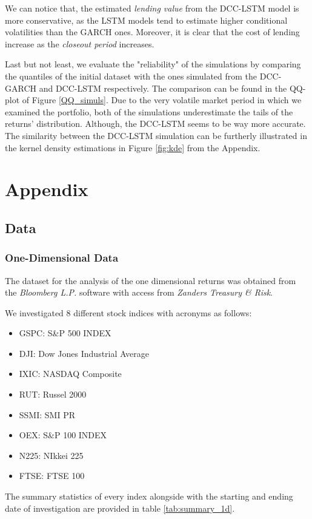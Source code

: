\documentclass[a4paper, oneside]{discothesis}
\begin{document}
We can notice that, the estimated \textit{lending value} from the DCC-LSTM model is more conservative, as the LSTM models tend to estimate higher conditional volatilities than the GARCH ones. Moreover, it is clear that the cost of lending increase as the \textit{closeout period} increases.

Last but not least, we evaluate the "reliability" of the simulations by comparing the quantiles of the initial dataset with the ones simulated from the DCC-GARCH and DCC-LSTM respectively. The comparison can be found in the QQ-plot of Figure \ref{QQ_simuls}. Due to the very volatile market period in which we examined the portfolio, both of the simulations underestimate the tails of the returns' distribution. Although, the DCC-LSTM seems to be way more accurate. The similarity between the DCC-LSTM simulation can be furtherly illustrated in the kernel density estimations in Figure \ref{fig:kde} from the Appendix.
\chapter{Appendix}
\section{Data}
\subsection{One-Dimensional Data} \label{ssec:1d_data}
The dataset for the analysis of the one dimensional returns was obtained from the \textit{Bloomberg L.P.} software with access from \textit{Zanders Treasury \& Risk}.

We investigated 8 different stock indices with acronyms as follows:
\begin{itemize}
\item GSPC: S\&P 500 INDEX
\item DJI: Dow Jones Industrial Average
\item IXIC: NASDAQ Composite
\item RUT: Russel 2000
\item SSMI: SMI PR
\item OEX: S\&P 100 INDEX
\item N225: NIkkei 225
\item FTSE: FTSE 100
\end{itemize}

The summary statistics of every index alongside with the starting and ending date of investigation are provided in table \ref{tab:summary_1d}.
\end{document}
